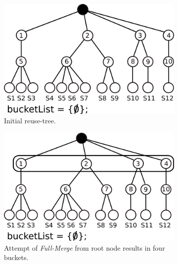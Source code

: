 \begin{figure}[t!]
	 \centering
	 \begin{subfigure}[t]{0.3\textwidth}
			 \includegraphics[width=\textwidth]{img/trma-full-merge5}
			 \caption{Initial reuse-tree.}
			 \label{fig:trma-full-merge1}
	 \end{subfigure}
	 \hspace{1mm}
	 \begin{subfigure}[t]{0.3\textwidth}
				\includegraphics[width=\textwidth]{img/trma-full-merge6}
				\caption{Attempt of {\em Full-Merge} from root node results in four buckets.}
				\label{fig:trma-full-merge2}
		\end{subfigure}
		\hspace{1mm}
		\begin{subfigure}[t]{0.3\textwidth}

\end{subfigure}
\end{figure}

